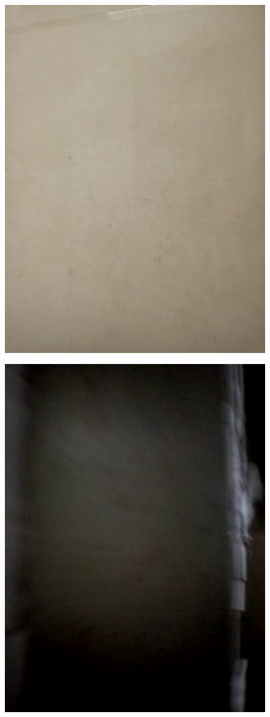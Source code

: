 \documentclass[19pt,a4paper]{article}
\begin{document}
\begin{figure}[H]
 \centering
 \includegraphics[scale=0.4]{7.png}
\end{figure}
\begin{figure}[H]
 \centering
 \includegraphics[scale=0.4]{8.png}
\end{figure}
\end{document}
